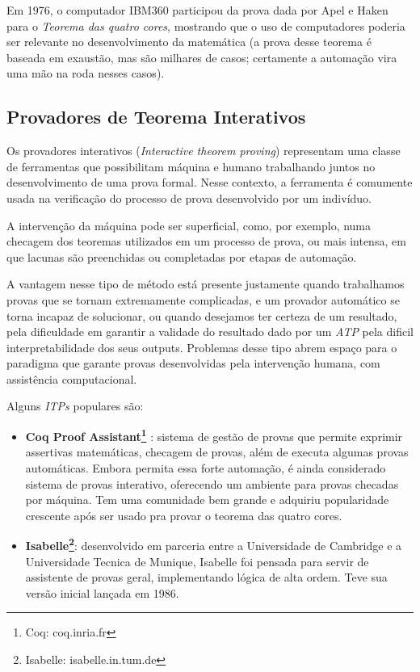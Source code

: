 Em 1976, o computador IBM360 participou da prova dada por Apel e Haken para o \textit{Teorema das quatro cores}, mostrando que o uso de computadores poderia ser relevante no desenvolvimento da matemática (a prova desse teorema é baseada em exaustão, mas são milhares de casos; certamente a automação vira uma mão na roda nesses casos).

\subsection{Provadores de Teorema Interativos}

Os provadores interativos (\textit{Interactive theorem proving}) representam uma classe de ferramentas que possibilitam máquina e humano trabalhando juntos no desenvolvimento de uma prova formal.
Nesse contexto, a ferramenta é comumente usada na verificação do processo de prova desenvolvido por um indivíduo.

A intervenção da máquina pode ser superficial, como, por exemplo, numa checagem dos teoremas utilizados em um processo de prova, ou mais intensa, em que lacunas são preenchidas ou completadas por etapas de automação.

A vantagem nesse tipo de método está presente justamente quando trabalhamos provas que se tornam extremamente complicadas, e um provador automático se torna incapaz de solucionar, ou quando desejamos ter certeza de um resultado, pela dificuldade em garantir a validade do resultado dado por um \textit{ATP} pela dificil interpretabilidade dos seus outputs.
Problemas desse tipo abrem espaço para o paradigma que garante provas desenvolvidas pela intervenção humana, com assistência computacional.

Alguns \textit{ITPs} populares são:
\begin{itemize}
    \item \textbf{Coq Proof Assistant\footnote{Coq: coq.inria.fr}} : sistema de gestão de provas que permite exprimir assertivas matemáticas, checagem de provas, além de executa algumas provas automáticas. Embora permita essa forte automação, é ainda considerado sistema de provas interativo, oferecendo um ambiente para provas checadas por máquina. Tem uma comunidade bem grande e adquiriu popularidade crescente após ser usado pra provar o teorema das quatro cores.

    \item \textbf{Isabelle\footnote{Isabelle: isabelle.in.tum.de}}: desenvolvido em parceria entre a Universidade de Cambridge e a Universidade Tecnica de Munique, Isabelle foi pensada para servir de assistente de provas geral, implementando lógica de alta ordem. Teve sua versão inicial lançada em 1986.
\end{itemize}

